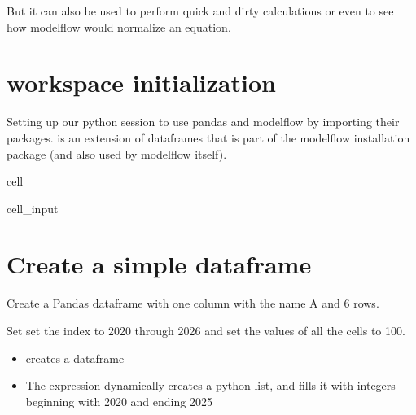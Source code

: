 \documentclass[letterpaper,10pt,english]{jupyterBook}
\begin{document}
\sphinxAtStartPar
But it can also be used to perform quick and dirty  calculations or even to see how modelflow would normalize an equation.


\section{workspace initialization}
\label{\detokenize{content/04_PythonEssentials/ExtendingDataFrames:workspace-initialization}}
\sphinxAtStartPar
Setting up our python session to use pandas and modelflow by importing their packages.   is an extension of dataframes that is part of the modelflow installation package (and also used by modelflow itself).

\begin{sphinxuseclass}{cell}\begin{sphinxVerbatimInput}

\begin{sphinxuseclass}{cell_input}
\begin{sphinxVerbatim}[commandchars=\\\{\}]
     
        
\end{sphinxVerbatim}

\end{sphinxuseclass}\end{sphinxVerbatimInput}

\end{sphinxuseclass}

\section{Create a  simple dataframe}
\label{\detokenize{content/04_PythonEssentials/ExtendingDataFrames:create-a-simple-dataframe}}
\sphinxAtStartPar
Create a Pandas dataframe with one column with the name A and 6 rows.

\sphinxAtStartPar
Set set the index to 2020 through 2026 and set the values of all the cells to 100.
\begin{itemize}
\item {} 
\sphinxAtStartPar
{} creates a dataframe  

\item {} 
\sphinxAtStartPar
The expression  dynamically creates a  python list, and fills it with  integers beginning with 2020 and ending 2025

\end{itemize}
\end{document}
